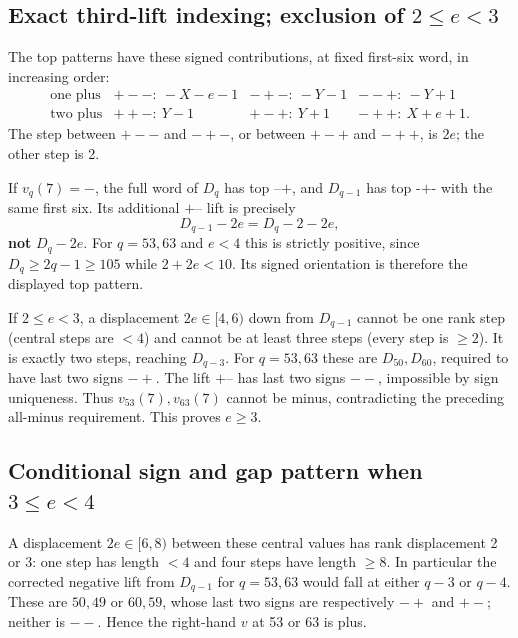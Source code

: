 \documentclass[
  11pt,
]{article}
\begin{document}
\subsection{\texorpdfstring{Exact third-lift indexing; exclusion of
\(2\le e<3\)}{Exact third-lift indexing; exclusion of 2\textbackslash le e\textless3}}\label{exact-third-lift-indexing-exclusion-of-2le-e3}

The top patterns have these signed contributions, at fixed first-six
word, in increasing order: \[
\begin{array}{c|ccc}
\text{one plus}&+--:\ -X-e-1&-+-:\ -Y-1&--+:\ -Y+1\\
\text{two plus}&++-:\ Y-1&+-+:\ Y+1&-++:\ X+e+1 .
\end{array}
\] The step between \(+--\) and \(-+-\), or between \(+-+\) and \(-++\),
is \(2e\); the other step is 2.

If \(v_q(7)=-\), the full word of \(D_q\) has top \(\texttt{--+}\), and
\(D_{q-1}\) has top \(\texttt{-+-}\) with the same first six. Its
additional \(\texttt{+--}\) lift is precisely \[
 D_{q-1}-2e = D_q-2-2e,
\] \textbf{not} \(D_q-2e\). For \(q=53,63\) and \(e<4\) this is strictly
positive, since \(D_q\ge2q-1\ge105\) while \(2+2e<10\). Its signed
orientation is therefore the displayed top pattern.

If \(2\le e<3\), a displacement \(2e\in[4,6)\) down from \(D_{q-1}\)
cannot be one rank step (central steps are \(<4\)) and cannot be at
least three steps (every step is \(\ge2\)). It is exactly two steps,
reaching \(D_{q-3}\). For \(q=53,63\) these are \(D_{50},D_{60}\),
required to have last two signs \(-+\). The lift \(\texttt{+--}\) has
last two signs \(--\), impossible by sign uniqueness. Thus
\(v_{53}(7),v_{63}(7)\) cannot be minus, contradicting the preceding
all-minus requirement. This proves \(e\ge3\).

\subsection{\texorpdfstring{Conditional sign and gap pattern when
\(3\le e<4\)}{Conditional sign and gap pattern when 3\textbackslash le e\textless4}}\label{conditional-sign-and-gap-pattern-when-3le-e4}

A displacement \(2e\in[6,8)\) between these central values has rank
displacement 2 or 3: one step has length \(<4\) and four steps have
length \(\ge8\). In particular the corrected negative lift from
\(D_{q-1}\) for \(q=53,63\) would fall at either \(q-3\) or \(q-4\).
These are \(50,49\) or \(60,59\), whose last two signs are respectively
\(-+\) and \(+-\); neither is \(--\). Hence the right-hand \(v\) at 53
or 63 is plus.
\end{document}
